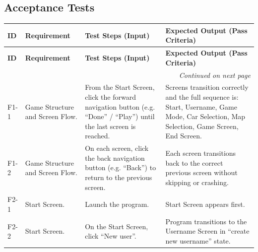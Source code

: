 \documentclass[12pt]{article}
\begin{document}
\subsection{Acceptance Tests}

\setlength{\LTpre}{6pt}
\setlength{\LTpost}{6pt}

\begingroup
\setlength{\parindent}{0pt}

\newlength{\widenby}
\setlength{\widenby}{45mm} %

\setlength{\LTleft}{-0.5\widenby}
\setlength{\LTright}{-0.5\widenby}

\noindent\begin{longtable}{|l|p{}|p{}|p{}|}
\hline
\textbf{ID} & \textbf{Requirement} & \textbf{Test Steps (Input)} & \textbf{Expected Output (Pass Criteria)} \\
\hline
\endfirsthead

\hline
\textbf{ID} & \textbf{Requirement} & \textbf{Test Steps (Input)} & \textbf{Expected Output (Pass Criteria)} \\
\hline
\endhead

\hline
\multicolumn{4}{r}{\small\textit{Continued on next page}} \\
\endfoot

\hline
\endlastfoot

F1-1 & Game Structure and Screen Flow. &
From the Start Screen, click the forward navigation button (e.g. “Done” / “Play”) until the last screen is reached. &
Screens transition correctly and the full sequence is: Start, Username, Game Mode, Car Selection, Map Selection, Game Screen, End Screen. \\
\hline

F1-2 & Game Structure and Screen Flow. &
On each screen, click the back navigation button (e.g. “Back”) to return to the previous screen. &
Each screen transitions back to the correct previous screen without skipping or crashing. \\
\hline

F2-1 & Start Screen. &
Launch the program. &
Start Screen appears first. \\
\hline

F2-2 & Start Screen. &
On the Start Screen, click “New user”. &
Program transitions to the Username Screen in “create new username” state. \\
\hline


\end{longtable}
\end{document}
